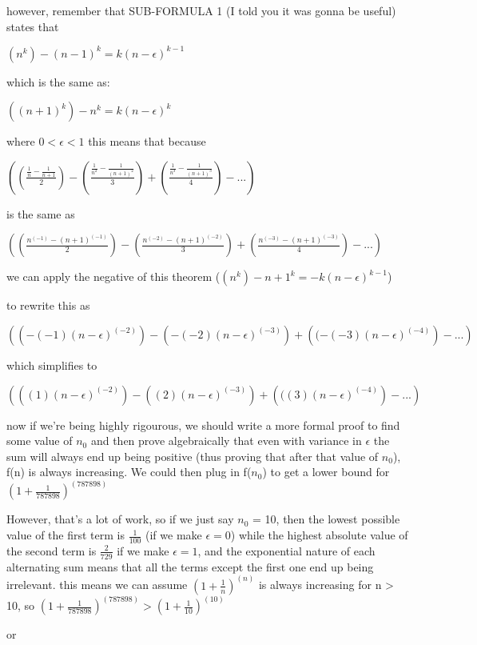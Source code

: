 \documentclass[11pt,fleqn]{article}
\theoremstyle{definition}
\theoremstyle{remark}
\begin{document}
however, remember that SUB-FORMULA 1 (I told you it was gonna be useful) states that

$(n^k) - {(n - 1)}^k = k(n-\epsilon)^{k - 1}$

which is the same as:

$({(n+1)}^k) - {n}^k = k(n-\epsilon)^{k}$

where $0 < \epsilon < 1$
this means that because

$\left(\left(\frac{{\frac{1}{n}} - {\frac{1}{n+1}}}{2}\right) - \left(\frac{{\frac{1}{n^2}} - {\frac{1}{{(n+1)}^2}}}{3}\right) + \left(\frac{{\frac{1}{n^3}} - {\frac{1}{{(n+1)}^3}}}{4}\right) - ...\right)$

is the same as 

$\left(\left(\frac{{n^{(-1)}} - {(n+1)^{(-1)}}}{2}\right) - \left(\frac{{{n^{(-2)}} - {{(n+1)}^{(-2)}}}}{3}\right) + \left(\frac{{{n^{(-3)}}} - {{{(n+1)}^{(-3)}}}}{4}\right) - ...\right)$

we can apply the negative of this theorem ($({n}^k) - {n+1}^k = -k(n-\epsilon)^{k-1}$)

to rewrite this as 

$\left(\left(-(-1){(n-\epsilon)}^{(-2)}\right) - \left(-(-2)(n-\epsilon)^{(-3)}\right) + \left((-(-3)(n-\epsilon)^{(-4)}\right) - ...\right)$

which simplifies to

$\left(\left((1){(n-\epsilon)}^{(-2)}\right) - \left((2)(n-\epsilon)^{(-3)}\right) + \left(((3)(n-\epsilon)^{(-4)}\right) - ...\right)$

now if we're being highly rigourous, we should write a more formal proof to 
find some value of $n_0$ and then prove algebraically that even with variance in 
$\epsilon$ the sum will always end up being positive (thus proving that after
that value of $n_0$), f(n) is always increasing. We could then plug in f($n_0$) to
get a lower bound for ${(1 + \frac{1}{787898})}^{(787898)}$

However, that's a lot of work, so if we just say $n_0$ = 10, then the 
lowest possible value of the first term is $\frac{1}{100}$ (if we make $\epsilon = 0$)
while the highest absolute value of the second term is $\frac{2}{729}$ if we make $\epsilon = 1$,
and the exponential nature of each alternating sum means that all the terms except the first one 
end up being irrelevant. this means we can assume ${(1 + \frac{1}{n})}^{(n)}$ is always increasing
for n > 10, so ${(1 + \frac{1}{787898})}^{(787898)} > {(1 + \frac{1}{10})}^{(10)}$

or 
\end{document}
